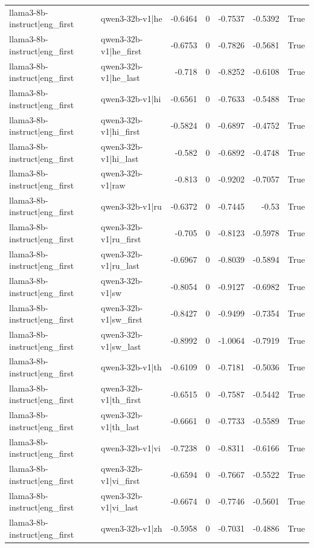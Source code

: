 \begin{table}
\begin{tabular}{l l r r r r l}
llama3-8b-instruct|eng_first & qwen3-32b-v1|he & -0.6464 & 0 & -0.7537 & -0.5392 & True \\
llama3-8b-instruct|eng_first & qwen3-32b-v1|he_first & -0.6753 & 0 & -0.7826 & -0.5681 & True \\
llama3-8b-instruct|eng_first & qwen3-32b-v1|he_last & -0.718 & 0 & -0.8252 & -0.6108 & True \\
llama3-8b-instruct|eng_first & qwen3-32b-v1|hi & -0.6561 & 0 & -0.7633 & -0.5488 & True \\
llama3-8b-instruct|eng_first & qwen3-32b-v1|hi_first & -0.5824 & 0 & -0.6897 & -0.4752 & True \\
llama3-8b-instruct|eng_first & qwen3-32b-v1|hi_last & -0.582 & 0 & -0.6892 & -0.4748 & True \\
llama3-8b-instruct|eng_first & qwen3-32b-v1|raw & -0.813 & 0 & -0.9202 & -0.7057 & True \\
llama3-8b-instruct|eng_first & qwen3-32b-v1|ru & -0.6372 & 0 & -0.7445 & -0.53 & True \\
llama3-8b-instruct|eng_first & qwen3-32b-v1|ru_first & -0.705 & 0 & -0.8123 & -0.5978 & True \\
llama3-8b-instruct|eng_first & qwen3-32b-v1|ru_last & -0.6967 & 0 & -0.8039 & -0.5894 & True \\
llama3-8b-instruct|eng_first & qwen3-32b-v1|sw & -0.8054 & 0 & -0.9127 & -0.6982 & True \\
llama3-8b-instruct|eng_first & qwen3-32b-v1|sw_first & -0.8427 & 0 & -0.9499 & -0.7354 & True \\
llama3-8b-instruct|eng_first & qwen3-32b-v1|sw_last & -0.8992 & 0 & -1.0064 & -0.7919 & True \\
llama3-8b-instruct|eng_first & qwen3-32b-v1|th & -0.6109 & 0 & -0.7181 & -0.5036 & True \\
llama3-8b-instruct|eng_first & qwen3-32b-v1|th_first & -0.6515 & 0 & -0.7587 & -0.5442 & True \\
llama3-8b-instruct|eng_first & qwen3-32b-v1|th_last & -0.6661 & 0 & -0.7733 & -0.5589 & True \\
llama3-8b-instruct|eng_first & qwen3-32b-v1|vi & -0.7238 & 0 & -0.8311 & -0.6166 & True \\
llama3-8b-instruct|eng_first & qwen3-32b-v1|vi_first & -0.6594 & 0 & -0.7667 & -0.5522 & True \\
llama3-8b-instruct|eng_first & qwen3-32b-v1|vi_last & -0.6674 & 0 & -0.7746 & -0.5601 & True \\
llama3-8b-instruct|eng_first & qwen3-32b-v1|zh & -0.5958 & 0 & -0.7031 & -0.4886 & True \\

\end{tabular}
\end{table}
